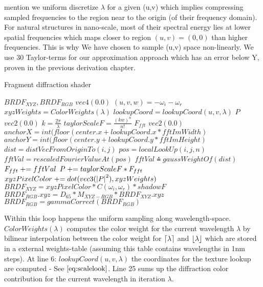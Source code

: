 mention we uniform discretize $\lambda$ for a given (u,v) which implies compressing sampled frequencies to the region near to the origin (of their frequency domain). 
For natural structures in nano-scale, most of their spectral energy lies at lower spatial frequencies which maps closer to region $(u,v) = (0,0)$ than higher frequencies. This is why We have chosen to sample (u,v) space non-linearly. We use 30 Taylor-terms for our approximation approach which has an error below Y, proven in the previous derivation chapter.

\begin{algorithm}[H]
  \caption{Fragment diffraction shader}
  \begin{algorithmic}[1]
      \State \init $BRDF_{XYZ}, BRDF_{RGB}$ \myto $vec4(0.0)$
      \State $(u,v,w) = -\omega_i - \omega_r$
        \State $xyzWeights = ColorWeights(\lambda)$
        \State $lookupCoord = lookupCoord(u, v, \lambda)$
        \State \init $P$ \myto $vec2(0.0)$
        \State $k = \frac{2\pi}{\lambda}$
          \State $taylorScaleF = \frac{(kw)^n}{n!}$
          \State \init $F_{fft}$  \myto $vec2(0.0)$
          \State $anchorX = int(floor(center.x + lookupCoord.x * fftImWidth)$
          \State $anchorY = int(floor(center.y + lookupCoord.y * fftImHeight)$
              \State $dist = distVecFromOriginTo(i,j)$
              \State $pos = localLookUp(i,j,n)$
              \State $fftVal = rescaledFourierValueAt(pos)$
              \State $fftVal \asteq gaussWeightOf(dist)$
              \State $F_{fft} \mathrel{+}= fftVal$
            \EndFor
          \EndFor
          \State $P \mathrel{+}= taylorScaleF*F_{fft}$
        \EndFor
        \State $xyzPixelColor \mathrel{+}= dot(vec3(\left|P\right|^2), xyzWeights)$
      \EndFor
      \State $BRDF_{XYZ} = xyzPixelColor*C(\omega_i, \omega_r)*shadowF$
      \State $BRDF_{RGB}.xyz = D_{65}*M_{XYZ-RGB}*BRDF_{XYZ}.xyz$
      \State $BRDF_{RGB}= gammaCorrect(BRDF_{RGB})$
    \EndFor
  \end{algorithmic}
\end{algorithm}


Within this loop happens the uniform sampling along wavelength-space. $ColorWeights(\lambda)$ computes the color weight for the current wavelength $\lambda$ by bilinear interpolation between the color weight for $\lceil\lambda\rceil$ and $\lfloor\lambda\rfloor$ which are stored in a external weights-table (assuming this table contains wavelengths in 1nm steps). At line 6: $lookupCoord(u, v, \lambda)$ the coordinates for the texture lookup are computed - See $\ref{eq:scalelook}$. Line 25 sums up the diffraction color contribution for the current wavelength in iteration $\lambda$.  

